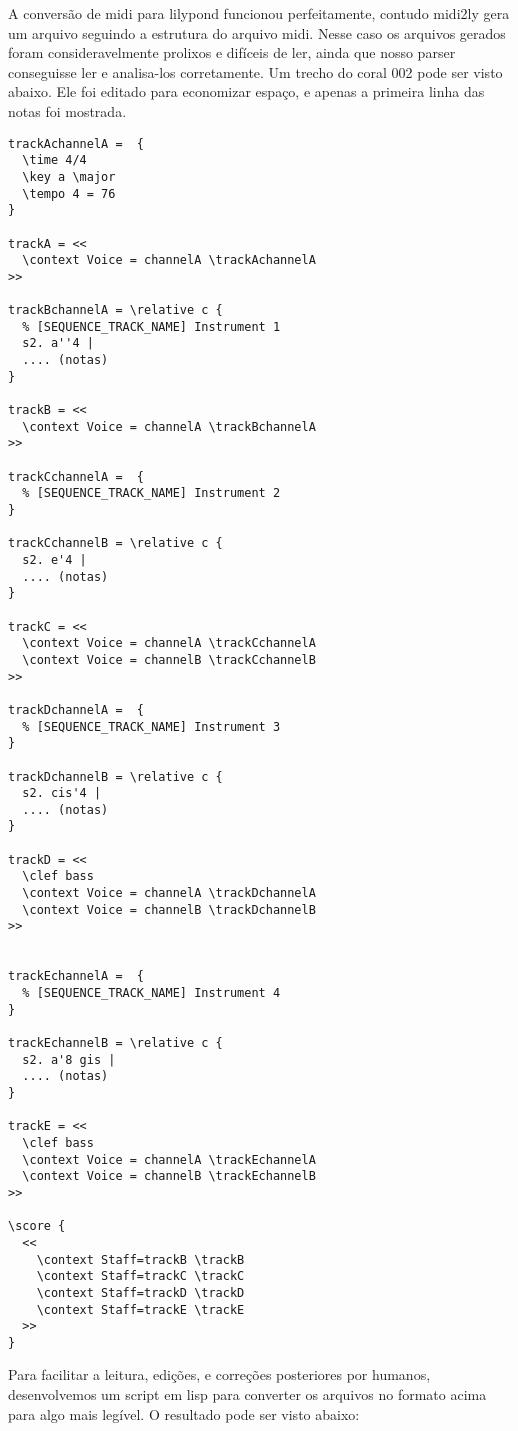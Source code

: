 \documentclass[12pt,brazil]{book}
\begin{document}
A conversão de midi para lilypond funcionou perfeitamente, contudo
midi2ly gera um arquivo seguindo a estrutura do arquivo midi. Nesse
caso os arquivos gerados foram consideravelmente prolixos e difíceis
de ler, ainda que nosso parser conseguisse ler e analisa-los
corretamente. Um trecho do coral 002 pode ser visto abaixo. Ele foi
editado para economizar espaço, e apenas a primeira linha das notas
foi mostrada.

\begin{verbatim}
trackAchannelA =  {
  \time 4/4 
  \key a \major
  \tempo 4 = 76 
}

trackA = <<
  \context Voice = channelA \trackAchannelA
>>

trackBchannelA = \relative c {
  % [SEQUENCE_TRACK_NAME] Instrument 1
  s2. a''4 |
  .... (notas)
}

trackB = <<
  \context Voice = channelA \trackBchannelA
>>

trackCchannelA =  {
  % [SEQUENCE_TRACK_NAME] Instrument 2
}

trackCchannelB = \relative c {
  s2. e'4 |
  .... (notas)
}

trackC = <<
  \context Voice = channelA \trackCchannelA
  \context Voice = channelB \trackCchannelB
>>

trackDchannelA =  {
  % [SEQUENCE_TRACK_NAME] Instrument 3
}

trackDchannelB = \relative c {
  s2. cis'4 |
  .... (notas)
}

trackD = <<
  \clef bass
  \context Voice = channelA \trackDchannelA
  \context Voice = channelB \trackDchannelB
>>


trackEchannelA =  {
  % [SEQUENCE_TRACK_NAME] Instrument 4
}

trackEchannelB = \relative c {
  s2. a'8 gis |
  .... (notas)
}

trackE = <<
  \clef bass
  \context Voice = channelA \trackEchannelA
  \context Voice = channelB \trackEchannelB
>>

\score {
  <<
    \context Staff=trackB \trackB
    \context Staff=trackC \trackC
    \context Staff=trackD \trackD
    \context Staff=trackE \trackE
  >>
}
\end{verbatim}

Para facilitar a leitura, edições, e correções posteriores por
humanos, desenvolvemos um script em lisp para converter os arquivos no
formato acima para algo mais legível. O resultado pode ser visto
abaixo:
\end{document}
